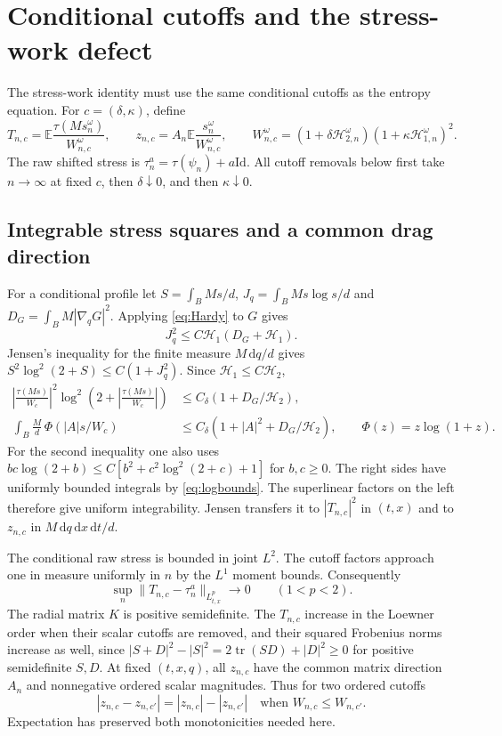 \documentclass[11pt]{article}
\numberwithin{equation}{section}
\newcommand{\E}{\mathbb E}
\newcommand{\dd}{\,\mathrm d}
\newcommand{\tr}{\operatorname{tr}}
\newcommand{\grad}{\nabla}
\newcommand{\Id}{\mathrm{Id}}
\newcommand{\Hone}{\mathcal H_1}
\newcommand{\Htwo}{\mathcal H_2}
\begin{document}
\section{Conditional cutoffs and the stress-work defect}\label{sec:work}
The stress-work identity must use the same conditional cutoffs as the entropy
equation. For $c=(\delta,\kappa)$, define
\begin{equation}\label{eq:cutstress}
 T_{n,c}=\E\frac{\tau(Ms_n^\omega)}{W_{n,c}^\omega},\qquad
 z_{n,c}=A_n\E\frac{s_n^\omega}{W_{n,c}^\omega},\qquad
 W_{n,c}^\omega=(1+\delta\mathcal H_{2,n}^\omega)(1+\kappa\mathcal H_{1,n}^\omega)^2.
\end{equation}
The raw shifted stress is $\tau_n^a=\tau(\psi_n)+a\Id$.
All cutoff removals below first take $n\to\infty$ at fixed $c$, then
$\delta\downarrow0$, and then $\kappa\downarrow0$.

\subsection{Integrable stress squares and a common drag direction}\label{subsec:cutbounds}
For a conditional profile let
$S=\int_BMs/d$, $J_q=\int_BMs\log s/d$ and
$D_G=\int_BM|\grad_qG|^2$. Applying \eqref{eq:Hardy} to $G$ gives
\[
 J_q^2\leq C\Hone(D_G+\Hone).
\]
Jensen's inequality for the finite measure $M\dd q/d$ gives
$S^2\log^2(2+S)\leq C(1+J_q^2)$. Since $\Hone\leq C\Htwo$,
\begin{align}
 \left|\frac{\tau(Ms)}{W_c}\right|^2
 \log^2\left(2+\left|\frac{\tau(Ms)}{W_c}\right|\right)
 &\leq C_\delta(1+D_G/\Htwo),\label{eq:stressOrlicz}\\
 \int_B\frac M d\,\Phi(|A|s/W_c)
 &\leq C_\delta(1+|A|^2+D_G/\Htwo),\qquad
 \Phi(z)=z\log(1+z).\label{eq:dragOrlicz}
\end{align}
For the second inequality one also uses
$bc\log(2+b)\leq C[b^2+c^2\log^2(2+c)+1]$ for $b,c\geq0$.
The right sides have uniformly bounded integrals by \eqref{eq:logbounds}.
The superlinear factors on the left therefore give uniform integrability.
Jensen transfers it to $|T_{n,c}|^2$ in $(t,x)$ and to $z_{n,c}$ in
$M\dd q\dd x\dd t/d$.

The conditional raw stress is bounded in joint $L^2$. The cutoff factors
approach one in measure uniformly in $n$ by the $L^1$ moment bounds.
Consequently
\begin{equation}\label{eq:Lpcut}
 \sup_n\|T_{n,c}-\tau_n^a\|_{L^p_{t,x}}\longrightarrow0
       \qquad(1<p<2).
\end{equation}
The radial matrix $K$ is positive semidefinite. The $T_{n,c}$ increase in the
Loewner order when their scalar cutoffs are removed, and their squared
Frobenius norms increase as well, since
$|S+D|^2-|S|^2=2\tr(SD)+|D|^2\geq0$ for positive semidefinite $S,D$.
At fixed $(t,x,q)$, all $z_{n,c}$ have the common matrix direction $A_n$ and
nonnegative ordered scalar magnitudes. Thus for two ordered cutoffs
\begin{equation}\label{eq:polar}
 |z_{n,c}-z_{n,c'}|=|z_{n,c}|-|z_{n,c'}|
 \quad\text{when }W_{n,c}\leq W_{n,c'}.
\end{equation}
Expectation has preserved both monotonicities needed here.
\end{document}
